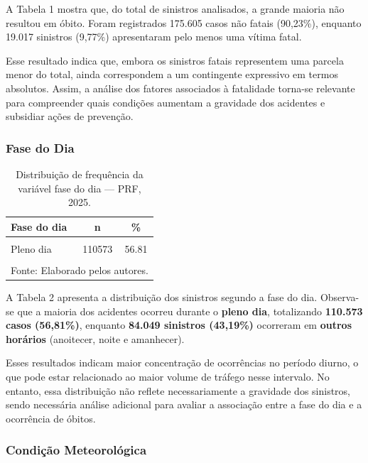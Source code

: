 \documentclass[
  brazilian,
  12pt,
]{article}
\begin{document}
A Tabela 1 mostra que, do total de sinistros analisados, a grande
maioria não resultou em óbito. Foram registrados 175.605 casos não
fatais (90,23\%), enquanto 19.017 sinistros (9,77\%) apresentaram pelo
menos uma vítima fatal.

Esse resultado indica que, embora os sinistros fatais representem uma
parcela menor do total, ainda correspondem a um contingente expressivo
em termos absolutos. Assim, a análise dos fatores associados à
fatalidade torna-se relevante para compreender quais condições aumentam
a gravidade dos acidentes e subsidiar ações de prevenção.

\subsubsection{Fase do Dia}\label{fase-do-dia}

\begingroup\fontsize{11}{13}\selectfont

\begin{longtable}[t]{lcc}
\caption{\label{tab:tab2}Distribuição de frequência da variável fase do dia — PRF, 2025.}\\
\toprule
Fase do dia & n & \%\\
\midrule
\cellcolor{gray!10}{Outros horários} & \cellcolor{gray!10}{84049} & \cellcolor{gray!10}{43.19}\\
Pleno dia & 110573 & 56.81\\
\textbf{\cellcolor{gray!10}{Total}} & \textbf{\cellcolor{gray!10}{194622}} & \textbf{\cellcolor{gray!10}{100.00}}\\
\bottomrule
\multicolumn{3}{l}{\rule{0pt}{1em}Fonte: Elaborado pelos autores.}\\
\end{longtable}
\endgroup{}

A Tabela 2 apresenta a distribuição dos sinistros segundo a fase do dia.
Observa-se que a maioria dos acidentes ocorreu durante o \textbf{pleno
dia}, totalizando \textbf{110.573 casos (56,81\%)}, enquanto
\textbf{84.049 sinistros (43,19\%)} ocorreram em \textbf{outros
horários} (anoitecer, noite e amanhecer).

Esses resultados indicam maior concentração de ocorrências no período
diurno, o que pode estar relacionado ao maior volume de tráfego nesse
intervalo. No entanto, essa distribuição não reflete necessariamente a
gravidade dos sinistros, sendo necessária análise adicional para avaliar
a associação entre a fase do dia e a ocorrência de óbitos.

\subsubsection{Condição
Meteorológica}\label{condiuxe7uxe3o-meteoroluxf3gica}
\end{document}
